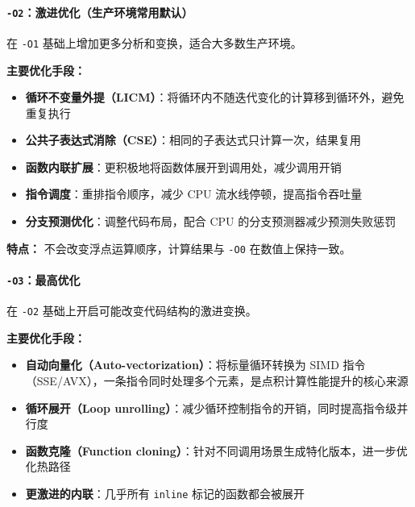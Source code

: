 \documentclass[12pt,fontset=none]{ctexart}
\providecommand{\tightlist}{%
  \setlength{\itemsep}{0pt}\setlength{\parskip}{0pt}}
\begin{document}
\paragraph{\texorpdfstring{\texttt{-O2}：激进优化（生产环境常用默认）}{-O2：激进优化（生产环境常用默认）}}\label{-o2ux6fc0ux8fdbux4f18ux5316ux751fux4ea7ux73afux5883ux5e38ux7528ux9ed8ux8ba4}

在 \texttt{-O1} 基础上增加更多分析和变换，适合大多数生产环境。

\textbf{主要优化手段：}

\begin{itemize}
\tightlist
\item
  \textbf{循环不变量外提（LICM）}：将循环内不随迭代变化的计算移到循环外，避免重复执行
\item
  \textbf{公共子表达式消除（CSE）}：相同的子表达式只计算一次，结果复用
\item
  \textbf{函数内联扩展}：更积极地将函数体展开到调用处，减少调用开销
\item
  \textbf{指令调度}：重排指令顺序，减少 CPU 流水线停顿，提高指令吞吐量
\item
  \textbf{分支预测优化}：调整代码布局，配合 CPU
  的分支预测器减少预测失败惩罚
\end{itemize}

\textbf{特点：} 不会改变浮点运算顺序，计算结果与 \texttt{-O0}
在数值上保持一致。

\paragraph{\texorpdfstring{\texttt{-O3}：最高优化}{-O3：最高优化}}\label{-o3ux6700ux9ad8ux4f18ux5316}

在 \texttt{-O2} 基础上开启可能改变代码结构的激进变换。

\textbf{主要优化手段：}

\begin{itemize}
\tightlist
\item
  \textbf{自动向量化（Auto-vectorization）}：将标量循环转换为 SIMD
  指令（SSE/AVX），一条指令同时处理多个元素，是点积计算性能提升的核心来源
\item
  \textbf{循环展开（Loop
  unrolling）}：减少循环控制指令的开销，同时提高指令级并行度
\item
  \textbf{函数克隆（Function
  cloning）}：针对不同调用场景生成特化版本，进一步优化热路径
\item
  \textbf{更激进的内联}：几乎所有 \texttt{inline} 标记的函数都会被展开
\end{itemize}
\end{document}
